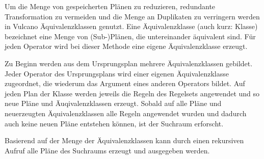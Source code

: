 Um die Menge von gespeicherten Plänen zu reduzieren, redundante Transformation zu vermeiden und die Menge an Duplikaten zu verringern werden in Vulcano Äquivalenzklassen genutzt. Eine Äquivalenzklasse (auch kurz: Klasse) bezeichnet eine Menge von (Sub-)Plänen, die untereinander äquivalent sind. Für jeden Operator wird bei dieser Methode eine eigene Äquivalenzklasse erzeugt.

Zu Beginn werden aus dem Ursprungsplan mehrere Äquivalenzklassen gebildet. Jeder Operator des Ursprungsplans wird einer eigenen Äquivalenzklasse zugeordnet, die wiederum das Argument eines anderen Operators bildet. Auf jeden Plan der Klasse werden jeweils die Regeln des Regelsets angewendet und so neue Pläne und Äuqivalenzklassen erzeugt. Sobald auf alle Pläne und neuerzeugten Äquivalenzklassen alle Regeln angewendet wurden und dadurch auch keine neuen Pläne entstehen können, ist der Suchraum erforscht.

Basierend auf der Menge der Äquivalenzklassen kann durch einen rekursiven Aufruf alle Pläne des Suchraums erzeugt und ausgegeben werden.

